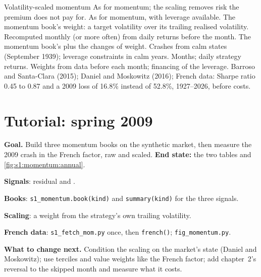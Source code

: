 \begin{strategyfile}{Volatility-scaled momentum}\label{strat:s1:momentum:scaled}
 As for momentum; the scaling removes risk the premium does not pay for.
 As for momentum, with leverage available.
 The momentum book's weight: a target volatility over its trailing realised volatility.
 Recomputed monthly (or more often) from daily returns before the month.
 The momentum book's plus the changes of weight.
 Crashes from calm states (September 1939); leverage constraints in calm years.
 Months; daily strategy returns.
 Weights from data before each month; financing of the leverage.
 Barroso and Santa-Clara (2015); Daniel and Moskowitz (2016); French data: Sharpe ratio 0.45 to 0.87 and a 2009 loss of 16.8\% instead of
52.8\%, 1927--2026, before costs.
\end{strategyfile}

\section{Tutorial: spring 2009}\label{tut:s1:momentum:tut}

\begin{tutorial}
\textbf{Goal.} Build three momentum books on the synthetic market, then measure the 2009 crash in the French factor, raw and scaled. \textbf{End state:} the
two tables and \cref{fig:s1:momentum:annual}.
\begin{tutsteps}
\item \textbf{Signals}: residual and .
\label{lst:s1:momentum:signals}
\item \textbf{Books}: \texttt{s1\_momentum.book(kind)} and \texttt{summary(kind)} for the three signals.
\item \textbf{Scaling}: a weight from the strategy's own trailing volatility.
\label{lst:s1:momentum:scale}
\item \textbf{French data}: \texttt{s1\_fetch\_mom.py} once, then \texttt{french()}; \texttt{fig\_momentum.py}.
\end{tutsteps}
\textbf{What to change next.} Condition the scaling on the market's state (Daniel and Moskowitz); use terciles and value weights like the French factor; add
chapter~2's reversal to the skipped month and measure what it costs.
\end{tutorial}

